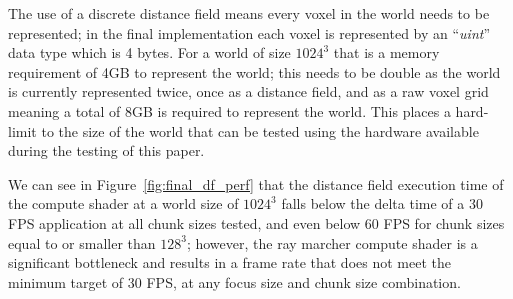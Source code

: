 The use of a discrete distance field means every voxel in the world needs to be represented; in the final implementation
each voxel is represented by an ``\textit{uint}'' data type which is 4 bytes. For a world of size $1024^3$ that is a
memory requirement of 4GB to represent the world; this needs to be double as the world is currently represented
twice, once as a distance field, and as a raw voxel grid meaning a total of 8GB is required to represent the world. This
places a hard-limit to the size of the world that can be tested using the hardware available during the testing of this
paper.

We can see in Figure~\ref{fig:final_df_perf} that the distance field execution time of the compute shader at a world
size of $1024^3$ falls below the delta time of a 30 FPS application at all chunk sizes tested, and even below 60 FPS
for chunk sizes equal to or smaller than $128^3$; however, the ray marcher compute shader is a significant bottleneck
and results in a frame rate that does not meet the minimum target of 30 FPS, at any focus size and chunk size
combination.

